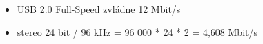 \documentclass[12pt, a4paper]{article}
\begin{document}
\begin{itemize}
    \item USB 2.0 Full-Speed zvládne 12 Mbit/s
    \item stereo 24 bit / 96 kHz = 96 000 * 24 * 2 = 4,608 Mbit/s
\end{itemize}






        
\end{document}
